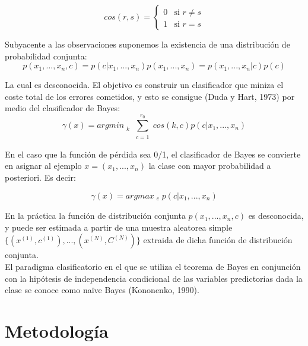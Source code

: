 	\[ cos(r, s) = \left \{ \begin{matrix} 0 & \mbox{si }r \ne s
\\ 1 & \mbox{si }r = s \end{matrix}\right. \]

	Subyacente a las observaciones suponemos la existencia de una distribución de probabilidad conjunta:\\

	\[
		p(x_{1}, ..., x_{n}, c) = p(c | x_{1}, ..., x_{n})p(x_{1}, ..., x_{n}) = p(x_{1}, ..., x_{n}|c)p(c)
	\]

	La cual es desconocida. El objetivo es construir un clasificador que miniza el coste total de los errores cometidos, y esto se consigue (Duda y Hart, 1973) por medio del clasificador de Bayes:\\

	\[
		\gamma(x) = arg min_{\substack{k}} \sum^{r_{0}}_{\substack{c = 1}} cos(k,c)p(c | x_{1}, ..., x_{n})
	\]

	En el caso que la función de pérdida sea 0/1, el clasificador de Bayes se convierte en asignar al ejemplo \begin{math} x = (x_{1}, ..., x_{n})\end{math} la clase con mayor probabilidad a posteriori. Es decir:

	\[
		\gamma(x) = arg max_{\substack{c}} p(c | x_{1}, ..., x_{n})
	\]

	En la práctica la función de distribución conjunta \begin{math} p(x_{1}, ..., x_{n}, c) \end{math} es desconocida, y puede ser estimada a partir de una muestra aleatorea simple \begin{math} \{ (x^{(1)}, c^{(1)} ), ..., (x^{(N)}, C^{(N)})\}\end{math} extraida de dicha función de distribución conjunta.\\

	El paradigma clasificatorio en el que se utiliza el teorema de Bayes en conjunción con la hipótesis de independencia condicional de las variables predictorias dada la clase se conoce como naïve Bayes (Kononenko, 1990).\\

	


\section{Metodología}
\label{sec:MetodologiaDetalle}

